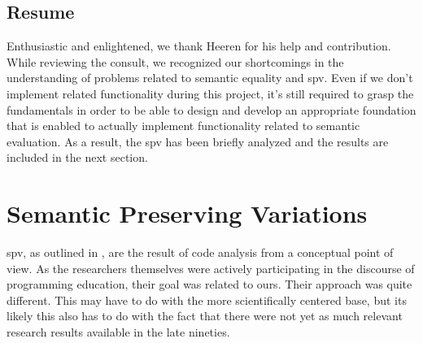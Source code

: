 \subsection{Resume}
Enthusiastic and enlightened, we thank Heeren for his help and contribution.
While reviewing the consult, we recognized our shortcomings in the understanding
of problems related to semantic equality and \gls{spv}. Even if we 
don't implement related functionality during this project, it's still required
to grasp the fundamentals in order to be able to design and develop an 
appropriate foundation that is enabled to actually implement functionality 
related to semantic evaluation. As a result, the \gls{spv} has been briefly
analyzed and the results are included in the next section.

\section{Semantic Preserving Variations}
\gls{spv}, as outlined in \citep{xu2003transformation}, are the result of code
analysis from a conceptual point of view. As the researchers themselves were
actively participating in the discourse of programming education, their goal
was related to ours. Their approach was quite different. This may have to do
with the more scientifically centered base, but its likely this also has to do
with the fact that there were not yet as much relevant research results 
available in the late nineties. 

